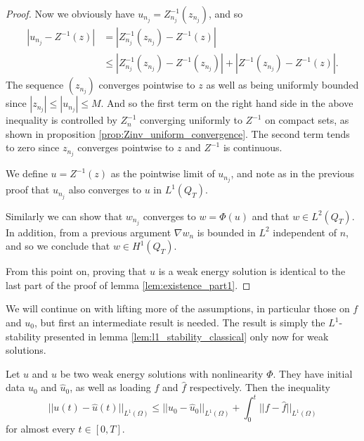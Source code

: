 \documentclass[11pt, a4paper]{article}
\begin{document}
\begin{proof}
Now we obviously have $u_{n_j} = Z_{n_j}^{-1}(z_{n_j})$, and so
\begin{align*}
|u_{n_j} - Z^{-1}(z)| &= |Z_{n_j}^{-1}(z_{n_j}) - Z^{-1}(z)| \\
&\leq |Z_{n_j}^{-1}(z_{n_j}) - Z^{-1}(z_{n_j})| + |Z^{-1}(z_{n_j})- Z^{-1}(z)|.
\end{align*}
The sequence $(z_{n_j})$ converges pointwise to $z$ as well as being uniformly bounded 
since $|z_{n_j}| \leq |u_{n_j}| \leq M$. And so the first term on the right hand side in the above inequality is controlled by $Z_n^{-1}$ converging uniformly to $Z^{-1}$ on compact sets, as shown in proposition \ref{prop:Zinv_uniform_convergence}. The second term tends to zero since $z_{n_j}$ converges pointwise to $z$ and $Z^{-1}$ is continuous.

We define $u=Z^{-1}(z)$ as the pointwise limit of $u_{n_j}$, and note as in the previous proof that $u_{n_j}$ also converges to $u$ in $L^1(Q_T)$.

Similarly we can show that $w_{n_j}$ converges to $w=\Phi(u)$ and that $w \in L^2(Q_T)$.
In addition, from a previous argument $\nabla w_n$ is bounded in $L^2$ independent of $n$, and so we conclude that $w \in H^1(Q_T)$.

From this point on, proving that $u$ is a weak energy solution is identical to the last part of the proof of lemma \ref{lem:existence_part1}.
\end{proof}

We will continue on with lifting more of the assumptions, in particular those on $f$ and $u_0$, but first an intermediate result is needed. The result is simply the $L^1$-stability presented in lemma \ref{lem:l1_stability_classical} only now for weak solutions.

\begin{lemma}
\label{lem:l1_stability_weak}
Let $u$ and $\hat{u}$ be two weak energy solutions with nonlinearity $\Phi$. They have initial data $u_0$ and $\hat{u}_0$, as well as loading $f$ and $\hat{f}$ respectively. Then the inequality
\begin{equation}
||u(t) - \hat{u}(t)||_{L^1(\Omega)} \leq ||u_0 - \hat{u}_0||_{L^1(\Omega)} + \int_0^t||f-\hat{f}||_{L^1(\Omega)}
\end{equation}
for almost every $t\in [0,T]$.
\end{lemma}
\end{document}
